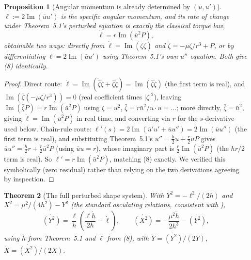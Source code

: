 \documentclass[12pt]{amsart}
\theoremstyle{plain}
\newtheorem{theorem}{Theorem}[section]
\newtheorem{proposition}[theorem]{Proposition}
\theoremstyle{remark}
\begin{document}
\begin{proposition}[Angular momentum is already determined by $(u,u')$]\label{prop:ell}
$\ell:=2\operatorname{Im}(\bar uu')$ is the specific angular momentum, and its rate of change under Theorem~5.1's perturbed equation is exactly the classical torque law,
\begin{equation}
\dot\ell = r\operatorname{Im}(\bar u^2P), \tag{8}
\end{equation}
obtainable two ways: directly from $\dot\ell=\operatorname{Im}(\bar\zeta\ddot\zeta)$ and $\ddot\zeta=-\mu\zeta/r^3+P$, or by differentiating $\ell=2\operatorname{Im}(\bar uu')$ using Theorem~5.1's own $u''$ equation. Both give (8) identically.
\end{proposition}

\begin{proof}
Direct route: $\dot\ell=\operatorname{Im}(\dot{\bar\zeta}\dot\zeta+\bar\zeta\ddot\zeta)=\operatorname{Im}(\bar\zeta\ddot\zeta)$ (the first term is real), and $\operatorname{Im}(\bar\zeta(-\mu\zeta/r^3))=0$ (real coefficient times $|\zeta|^2$), leaving $\operatorname{Im}(\bar\zeta P)=r\operatorname{Im}(\bar u^2P)$ using $\zeta=u^2$, $\bar\zeta=r\bar u^2/u\cdot u=\dots$; more directly, $\bar\zeta=\bar u^2$, giving $\dot\ell=\operatorname{Im}(\bar u^2P)$ in real time, and converting via $r$ for the $s$-derivative used below. Chain-rule route: $\ell'(s)=2\operatorname{Im}(\bar u'u'+\bar uu'')=2\operatorname{Im}(\bar uu'')$ (the first term is real), and substituting Theorem~5.1's $u''=\tfrac h2u+\tfrac r2\bar uP$ gives $\bar uu''=\tfrac h2r+\tfrac r2\bar u^2P$ (using $\bar uu=r$), whose imaginary part is $\tfrac r2\operatorname{Im}(\bar u^2P)$ (the $h r/2$ term is real). So $\ell'=r\operatorname{Im}(\bar u^2P)$, matching (8) exactly. We verified this symbolically (zero residual) rather than relying on the two derivations agreeing by inspection.
\end{proof}

\begin{theorem}[The full perturbed shape system]\label{thm:fullxyt}
With $Y^2=-\ell^2/(2h)$ and $X^2=\mu^2/(4h^2)-Y^2$ (the standard osculating relations, consistent with \cite{Ebert2026Cone}),
\begin{equation}
\dot{(Y^2)} = \frac{\ell}{h}\left(\frac{\ell\dot h}{2h}-\dot\ell\right), \qquad
\dot{(X^2)} = -\frac{\mu^2\dot h}{2h^3}-\dot{(Y^2)}, \tag{9}
\end{equation}
using $\dot h$ from Theorem~5.1 and $\dot\ell$ from (8), with $\dot Y=\dot{(Y^2)}/(2Y)$, $\dot X=\dot{(X^2)}/(2X)$.
\end{theorem}
\end{document}
